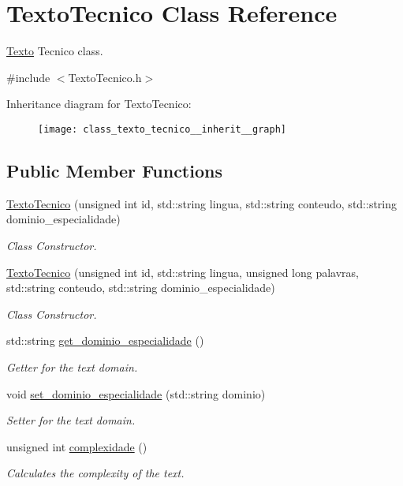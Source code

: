 \hypertarget{class_texto_tecnico}{\section{Texto\-Tecnico Class Reference}
\label{class_texto_tecnico}
}


\hyperlink{class_texto}{Texto} Tecnico class.  




{\ttfamily \#include $<$Texto\-Tecnico.\-h$>$}



Inheritance diagram for Texto\-Tecnico\-:
\nopagebreak
\begin{figure}[H]
\begin{center}
\leavevmode
\texttt{[image: class\_texto\_tecnico\_\_inherit\_\_graph]}
\end{center}
\end{figure}
\subsection*{Public Member Functions}
\begin{DoxyCompactItemize}
\item 
\hyperlink{class_texto_tecnico_a4c770469d3a65f750b4551bef18629a9}{Texto\-Tecnico} (unsigned int id, std\-::string lingua, std\-::string conteudo, std\-::string dominio\-\_\-especialidade)
\begin{DoxyCompactList}\small\item\em Class Constructor. \end{DoxyCompactList}\item 
\hyperlink{class_texto_tecnico_adc11a5c4366f90c1f22fc986c4bc2131}{Texto\-Tecnico} (unsigned int id, std\-::string lingua, unsigned long palavras, std\-::string conteudo, std\-::string dominio\-\_\-especialidade)
\begin{DoxyCompactList}\small\item\em Class Constructor. \end{DoxyCompactList}\item 
std\-::string \hyperlink{class_texto_tecnico_af0541bfc3a8fc861eb13abba28a6768d}{get\-\_\-dominio\-\_\-especialidade} ()
\begin{DoxyCompactList}\small\item\em Getter for the text domain. \end{DoxyCompactList}\item 
void \hyperlink{class_texto_tecnico_af66d0b574c0e3316870fb8fdc3223c74}{set\-\_\-dominio\-\_\-especialidade} (std\-::string dominio)
\begin{DoxyCompactList}\small\item\em Setter for the text domain. \end{DoxyCompactList}\item 
unsigned int \hyperlink{class_texto_tecnico_aeeeff7367e226e4fc0f0d4cdb692e85d}{complexidade} ()
\begin{DoxyCompactList}\small\item\em Calculates the complexity of the text. \end{DoxyCompactList}\end{DoxyCompactItemize}
